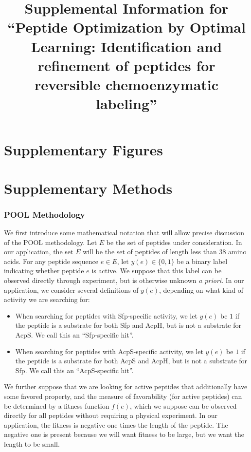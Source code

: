\documentclass[11pt]{article}
\begin{document}
\title{Supplemental Information for \enquote{Peptide Optimization by Optimal Learning: 
Identification and refinement of peptides for reversible chemoenzymatic labeling}}
\maketitle
\tableofcontents
\newpage
\part{Supplementary Figures}
\part{Supplementary Methods}
\section{POOL Methodology}

We first introduce some mathematical notation that will allow precise discussion of the POOL methodology. Let $E$ be the set of peptides under consideration.
In our application, the set $E$ will be the set of peptides of length less than 38 amino acids.
For any peptide sequence $e \in E$, let $y(e) \in \{0, 1\}$ be a binary label indicating whether
peptide $e$ is active.  We suppose that this label can be observed directly through experiment, but is otherwise unknown {\it a priori}.
In our application, we consider several definitions of $y(e)$, depending on what kind of activity we are searching for:
\begin{itemize}
\item When searching for peptides with Sfp-specific activity, we let $y(e)$ be $1$ if the peptide is a substrate for both Sfp and AcpH, but is not a substrate for AcpS.  We call this an \enquote{Sfp-specific hit}.
\item When searching for peptides with AcpS-specific activity, we let $y(e)$ be $1$ if the peptide is a substrate for both AcpS and AcpH, but is not a substrate for Sfp.  We call this an \enquote{AcpS-specific hit}.
\end{itemize}

We further suppose that we are looking for active peptides that additionally have some
favored property, and the measure of favorability (for active peptides) can be
determined by a fitness function $f(e)$, which we suppose can be observed directly for all peptides without requiring a physical experiment. In our application, the fitness is negative one times the length of the peptide.  The negative one is present because we will want fitness to be large, but we want the length to be small.
\end{document}
